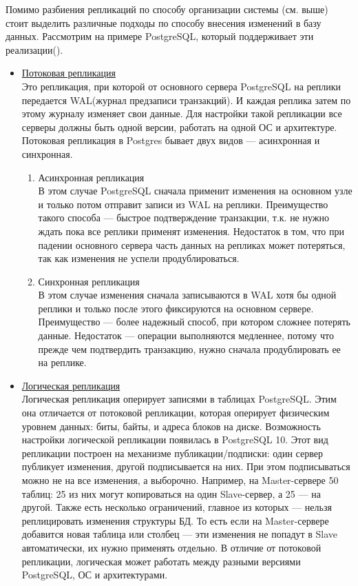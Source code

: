 \begin{enumerate}
    Помимо разбиения репликаций по способу организации системы (см. выше) стоит выделить различные подходы по способу внесения изменений в базу данных. Рассмотрим на примере PostgreSQL, который поддерживает эти реализации(\autocite{PostrgreSQL1}).
    \begin{itemize}
        \item \underline{Потоковая репликация} \\Это репликация, при которой от основного сервера PostgreSQL на реплики передается WAL(журнал предзаписи транзакций). И каждая реплика затем по этому журналу изменяет свои данные. Для настройки такой репликации все серверы должны быть одной версии, работать на одной ОС и архитектуре. Потоковая репликация в Postgres бывает двух видов — асинхронная и синхронная.
		\begin{enumerate}
        		\item{Асинхронная репликация} \\В этом случае PostgreSQL сначала применит изменения на основном узле и только потом отправит записи из WAL на реплики. Преимущество такого способа — быстрое подтверждение транзакции, т.к. не нужно ждать пока все реплики применят изменения. Недостаток в том, что при падении основного сервера часть данных на репликах может потеряться, так как изменения не успели продублироваться.
        		\item{Синхронная репликация} \\В этом случае изменения сначала записываются в WAL хотя бы одной реплики и только после этого фиксируются на основном сервере. Преимущество — более надежный способ, при котором сложнее потерять данные. Недостаток — операции выполняются медленнее, потому что прежде чем подтвердить транзакцию, нужно сначала продублировать ее на реплике.
        	\end{enumerate}
        	\item \underline{Логическая репликация} \\Логическая репликация оперирует записями в таблицах PostgreSQL. Этим она отличается от потоковой репликации, которая оперирует физическим уровнем данных: биты, байты, и адреса блоков на диске. Возможность настройки логической репликации появилась в PostgreSQL 10.
Этот вид репликации построен на механизме публикации/подписки: один сервер публикует изменения, другой подписывается на них. При этом подписываться можно не на все изменения, а выборочно. Например, на Master-сервере 50 таблиц: 25 из них могут копироваться на один Slave-сервер, а 25 — на другой.
Также есть несколько ограничений, главное из которых — нельзя реплицировать изменения структуры БД. То есть если на Master-сервере добавится новая таблица или столбец — эти изменения не попадут в Slave автоматически, их нужно применять отдельно.
В отличие от потоковой репликации, логическая может работать между разными версиями PostgreSQL, ОС и архитектурами.
	\end{itemize}
    

\end{enumerate}
